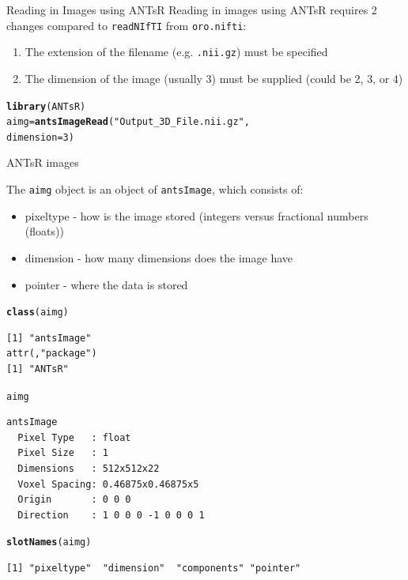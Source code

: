 \documentclass[11pt]{beamer}\usepackage[]{graphicx}\usepackage[]{color}
\makeatletter
\newcommand{\hlnum}[1]{\textcolor[rgb]{0.686,0.059,0.569}{#1}}%
\newcommand{\hlstr}[1]{\textcolor[rgb]{0.192,0.494,0.8}{#1}}%
\newcommand{\hlstd}[1]{\textcolor[rgb]{0.345,0.345,0.345}{#1}}%
\newcommand{\hlkwb}[1]{\textcolor[rgb]{0.69,0.353,0.396}{#1}}%
\newcommand{\hlkwc}[1]{\textcolor[rgb]{0.333,0.667,0.333}{#1}}%
\newcommand{\hlkwd}[1]{\textcolor[rgb]{0.737,0.353,0.396}{\textbf{#1}}}%
\newenvironment{kframe}{%
 \def\at@end@of@kframe{}%
 \ifinner\ifhmode%
  \def\at@end@of@kframe{\end{minipage}}%
  \begin{minipage}{\columnwidth}%
 \fi\fi%
 \def\FrameCommand##1{\hskip\@totalleftmargin \hskip-\fboxsep
 \colorbox{shadecolor}{##1}\hskip-\fboxsep
     \hskip-\linewidth \hskip-\@totalleftmargin \hskip\columnwidth}%
 \MakeFramed {\advance\hsize-\width
   \@totalleftmargin\z@ \linewidth\hsize
   \@setminipage}}%
 {\par\unskip\endMakeFramed%
 \at@end@of@kframe}
\newenvironment{knitrout}{}{} %
\makeatother
\begin{document}
\begin{frame}[fragile]{Reading in Images using ANTsR}
Reading in images using ANTsR requires 2 changes compared to \verb|readNIfTI| from \verb|oro.nifti|:
\begin{enumerate}
\item The extension of the filename (e.g. \verb|.nii.gz|) must be specified
\item The dimension of the image (usually 3) must be supplied (could be 2, 3, or 4)
\end{enumerate}

\begin{knitrout}
\color{fgcolor}\begin{kframe}
\begin{alltt}
\hlkwd{library}\hlstd{(ANTsR)}
\hlstd{aimg} \hlkwb{=} \hlkwd{antsImageRead}\hlstd{(}\hlstr{"Output_3D_File.nii.gz"}\hlstd{,}
        \hlkwc{dimension} \hlstd{=} \hlnum{3}\hlstd{)}
\end{alltt}
\end{kframe}
\end{knitrout}
\end{frame}


\begin{frame}[fragile]{ANTsR images}

The \verb|aimg| object is an object of \verb|antsImage|, which consists of:
\begin{itemize}
\item pixeltype - how is the image stored (integers versus fractional numbers (floats))
\item dimension - how many dimensions does the image have
\item pointer - where the data is stored
\end{itemize}

\begin{knitrout}
\color{fgcolor}\begin{kframe}
\begin{alltt}
\hlkwd{class}\hlstd{(aimg)}
\end{alltt}
\begin{verbatim}
[1] "antsImage"
attr(,"package")
[1] "ANTsR"
\end{verbatim}
\begin{alltt}
\hlstd{aimg}
\end{alltt}
\begin{verbatim}
antsImage
  Pixel Type   : float 
  Pixel Size   : 1 
  Dimensions   : 512x512x22 
  Voxel Spacing: 0.46875x0.46875x5 
  Origin       : 0 0 0 
  Direction    : 1 0 0 0 -1 0 0 0 1 
\end{verbatim}
\begin{alltt}
\hlkwd{slotNames}\hlstd{(aimg)}
\end{alltt}
\begin{verbatim}
[1] "pixeltype"  "dimension"  "components" "pointer"   
\end{verbatim}
\end{kframe}
\end{knitrout}
\end{frame}
\end{document}
